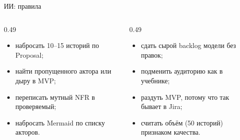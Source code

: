\begin{frame}{ИИ: правила}
  \vspace{0.2em}
  \begin{columns}[T]
    \begin{column}{0.49\textwidth}
      \begin{itemize}\setlength\itemsep{0.3em}
        \item набросать 10--15 историй по Proposal;
        \item найти пропущенного актора или дыру в MVP;
        \item переписать мутный NFR в проверяемый;
        \item набросать Mermaid по списку акторов.
      \end{itemize}
    \end{column}
    \begin{column}{0.49\textwidth}
      \begin{itemize}\setlength\itemsep{0.3em}
        \item сдать сырой backlog модели без правок;
        \item подменить аудиторию \flqq как в учебнике\frqq;
        \item раздуть MVP, потому что \flqq так бывает в Jira\frqq;
        \item считать объём (50 историй) признаком качества.
      \end{itemize}
    \end{column}
  \end{columns}
\end{frame}
